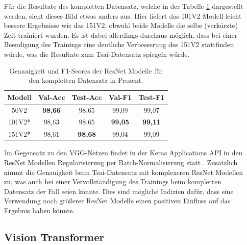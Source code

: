 \documentclass[twoside,a4paper]{IEEEtran}
\begin{document}
Für die Resultate des kompletten Datensatz, welche in der Tabelle \ref{resnet_ergebnis_full} dargestellt werden, sieht dieses Bild etwas anders aus. Hier liefert das 101V2 Modell leicht bessere Ergebnisse wie das 151V2, obwohl beide Modelle die selbe (verkürzte) Zeit trainiert wurden. Es ist dabei allerdings durchaus möglich, dass bei einer Beendigung des Trainings eine deutliche Verbesserung des 151V2 stattfinden würde, was die Resultate zum Tsai-Datensatz spiegeln würde.
\begin{table}[!htb]
	\caption{Genauigkeit und F1-Scores der ResNet Modelle für den kompletten Datensatz in Prozent.}
	\label{resnet_ergebnis_full}
	\centering
	\begin{tabular}{|c|c|c|c|c|}
		\hline
		Modell & Val-Acc & Test-Acc & Val-F1 & Test-F1\\
		\hline
		\hline 
		50V2 & \textbf{98,66} & 98,65 & 99,09 & 99,07\\
		\hline
		101V2* & 98,63 & 98,65 & \textbf{99,05} & \textbf{99,11}\\
		\hline
		151V2* & 98,61 & \textbf{98,68} & 99,04 & 99,09\\
		\hline 
	\end{tabular}
\end{table}

Im Gegensatz zu den VGG-Netzen findet in der Keras Applications API in den ResNet Modellen Regularisierung per Batch-Normalisierung statt \cite{resnet_keras}. Zusätzlich nimmt die Genauigkeit beim Tsai-Datensatz mit komplexeren ResNet Modellen zu, was auch bei einer Vervollständigung des Trainings beim kompletten Datensatz der Fall seien könnte. Dies sind mögliche Indizien dafür, dass eine Verwendung noch größerer ResNet Modelle einen positiven Einfluss auf das Ergebnis haben könnte.
\subsection{Vision Transformer}
\end{document}
